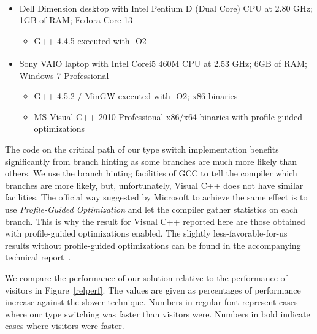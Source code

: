 \documentclass[preprint]{sigplanconf}
\begin{document}
\begin{itemize}
\setlength{\itemsep}{0pt}
\setlength{\parskip}{0pt}
\item Dell Dimension\textsuperscript{\textregistered} desktop with Intel\textsuperscript{\textregistered} Pentium\textsuperscript{\textregistered} 
      D (Dual Core) CPU at 2.80 GHz; 1GB of RAM; Fedora Core 13  
      \begin{itemize}
      \setlength{\itemsep}{0pt}
      \setlength{\parskip}{0pt}
      \item G++ 4.4.5 executed with -O2
      \end{itemize}
\item Sony VAIO\textsuperscript{\textregistered} laptop with Intel\textsuperscript{\textregistered} Core\texttrademark i5 460M 
      CPU at 2.53 GHz; 6GB of RAM; Windows 7 Professional
      \begin{itemize}
      \setlength{\itemsep}{0pt}
      \setlength{\parskip}{0pt}
      \item G++ 4.5.2 / MinGW executed with -O2; x86 binaries
      \item MS Visual C++ 2010 Professional x86/x64 binaries with profile-guided optimizations
      \end{itemize}
\end{itemize}

\noindent
The code on the critical path of our type switch implementation benefits 
significantly from branch hinting as some branches are much more likely than 
others. We use the branch hinting facilities of GCC to tell the compiler which 
branches are more likely, but, unfortunately, Visual C++ does not have similar 
facilities. The official way suggested by Microsoft to achieve the same effect 
is to use \emph{Profile-Guided Optimization} and let the compiler gather 
statistics on each branch. This is why the result for Visual C++ reported here 
are those obtained with profile-guided optimizations enabled. The slightly 
less-favorable-for-us results without profile-guided optimizations can be found 
in the accompanying technical report~\cite{TR}.

We compare the performance of our solution relative to the performance of visitors in 
Figure~\ref{relperf}. The values are given as percentages of performance increase 
against the slower technique. Numbers in regular font represent cases where our type 
switching was faster than visitors were. Numbers in bold indicate cases where 
visitors were faster.
\end{document}
